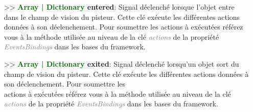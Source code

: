 \documentclass[a4paper, 11pt]{article}
\begin{document}
\begin{itemize}
		\item[>> \textbf{\textcolor{darkgreen}{Array | Dictionary} entered}:] Signal déclenché lorsque
		l'objet entre dans le champ de vision du pisteur. Cette clé exécute les différentes actions données
		à son déclenchement. Pour soumettre les actions à exécutées référez vous à la méthode utilisée au
		niveau de la clé \textit{\textcolor{gray}{actions}} de la propriété \textit{\textcolor{gray}
		{EventsBindings}} dans les bases du framework.\\
		\item[>> \textbf{\textcolor{darkgreen}{Array | Dictionary} exited}:] Signal déclenché lorsqu'un
		objet sort du champ de vision du pisteur. Cette clé exécute les différentes actions données à son
		déclenchement. Pour soumettre les \\actions à exécutées référez vous à la méthode utilisée au niveau
		de la clé \textit{\textcolor{gray}{actions}} de la propriété \textit{\textcolor{gray}
		{EventsBindings}} dans les bases du framework.
	\end{itemize}

\end{document}
